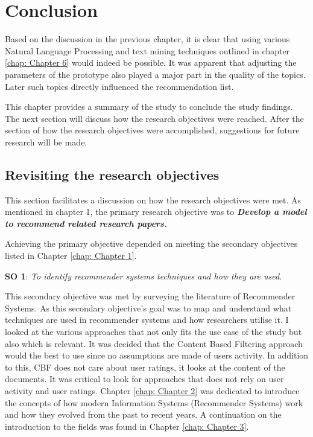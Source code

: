 \chapter{Conclusion}
\label{chap: Chapter 8}

Based on the discussion in the previous chapter, it is clear that using various Natural Language Processing and text mining techniques outlined in chapter \ref{chap: Chapter 6} would indeed be possible.
It was apparent that adjusting the parameters of the prototype also played a major part in the quality of the topics. Later such topics directly influenced the recommendation list.

This chapter provides a summary of the study to conclude the study findings. The next section will discuss how the research objectives were reached. After the section of how the research objectives were accomplished, suggestions for future research will be made.

\section{Revisiting the research objectives}

This section facilitates a discussion on how the research objectives were met. As mentioned in chapter 1, the primary research objective was to \textbf{\textit{Develop a model to recommend related research papers.}}

Achieving the primary objective depended on meeting the secondary objectives listed in Chapter \ref{chap: Chapter 1}.

\textbf{SO 1}: \textit{To identify recommender systems techniques and how they are used.}

This secondary objective was met by surveying the literature of Recommender Systems. As this secondary objective's goal was to map and understand what techniques are used in recommender systems and how researchers utilise it. I looked at the various approaches that not only fits the use case of the study but also which is relevant. It was decided that the Content Based Filtering approach would the best to use since no assumptions are made of users activity. In addition to this, CBF does not care about user ratings, it looks at the content of the documents. It was critical to look for approaches that does not rely on user activity and user ratings. Chapter \ref{chap: Chapter 2} was dedicated to introduce the concepts of how modern Information Systems (Recommender Systems) work and how they evolved from the past to recent years. A continuation on the introduction to the fields was found in Chapter \ref{chap: Chapter 3}.

